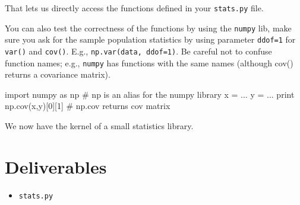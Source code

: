 \begin{fullwidth}
\noindent That lets us directly access the functions defined in your {\tt stats.py} file.
 
You can also test the correctness of the functions by using the {\tt numpy} lib, make sure you ask for the sample population statistics by using parameter {\tt ddof=1} for {\tt var()} and {\tt cov()}. E.g., {\tt np.var(data, ddof=1)}. Be careful not to confuse function names; e.g., {\tt numpy} has functions with the same names (although cov() returns a covariance matrix).

\begin{pyverbatim}
import numpy as np  # np is an alias for the numpy library
x = ...
y = ...
print np.cov(x,y)[0][1] # np.cov returns cov matrix
\end{pyverbatim}

We now have the kernel of a small statistics library.

\section{Deliverables}

\begin{itemize}
\item {\tt stats.py}
\end{itemize}

\end{fullwidth}

